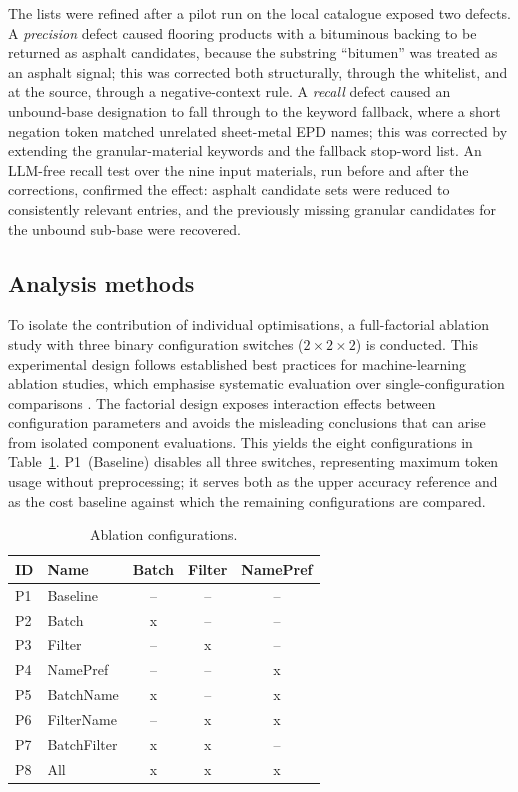 \documentclass[10pt, a4paper, twocolumn]{article}
\begin{document}
The lists were refined after a pilot run on the local catalogue exposed two defects.
A \emph{precision} defect caused flooring products with a bituminous backing to be
returned as asphalt candidates, because the substring ``bitumen'' was treated as an
asphalt signal; this was corrected both structurally, through the whitelist, and at the
source, through a negative-context rule. A \emph{recall} defect caused an unbound-base
designation to fall through to the keyword fallback, where a short negation token
matched unrelated sheet-metal EPD names; this was corrected by extending the
granular-material keywords and the fallback stop-word list. An LLM-free recall test over
the nine input materials, run before and after the corrections, confirmed the effect:
asphalt candidate sets were reduced to consistently relevant entries, and the previously
missing granular candidates for the unbound sub-base were recovered.

\subsection{Analysis methods}

To isolate the contribution of individual optimisations, a full-factorial ablation
study with three binary configuration switches ($2\times2\times2$) is conducted. This
experimental design follows established best practices for machine-learning ablation
studies, which emphasise systematic evaluation over single-configuration comparisons \cite{Fostiropoulos.2023}\cite{Meyes.2019}. The factorial design exposes
interaction effects between configuration parameters and avoids the misleading
conclusions that can arise from isolated component evaluations. This yields the eight
configurations in Table~\ref{tab:ablation}. P1~(Baseline) disables all three switches,
representing maximum token usage without preprocessing; it serves both as the upper
accuracy reference and as the cost baseline against which the remaining configurations
are compared.

\begin{table}[htbp]
  \caption{Ablation configurations.}
  \label{tab:ablation}
  \centering
  \small
  \begin{tabular}{llccc}
    \toprule
    \textbf{ID} & \textbf{Name} & \textbf{Batch} & \textbf{Filter} & \textbf{NamePref} \\
    \midrule
    P1 & Baseline    & --  & --  & --  \\
    P2 & Batch       & x   & --  & --  \\
    P3 & Filter      & --  & x   & --  \\
    P4 & NamePref    & --  & --  & x   \\
    P5 & BatchName   & x   & --  & x   \\
    P6 & FilterName  & --  & x   & x   \\
    P7 & BatchFilter & x   & x   & --  \\
    P8 & All         & x   & x   & x   \\
    \bottomrule
  \end{tabular}
\end{table}
\end{document}
